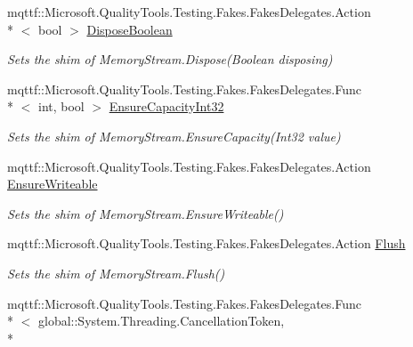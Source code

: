 \begin{DoxyCompactItemize}
mqttf\-::\-Microsoft.\-Quality\-Tools.\-Testing.\-Fakes.\-Fakes\-Delegates.\-Action\\*
$<$ bool $>$ \hyperlink{class_system_1_1_i_o_1_1_fakes_1_1_shim_memory_stream_ab2c9da88c1c5cb0ca93fac67727fd204}{Dispose\-Boolean}
\begin{DoxyCompactList}\small\item\em Sets the shim of Memory\-Stream.\-Dispose(\-Boolean disposing)\end{DoxyCompactList}\item 
mqttf\-::\-Microsoft.\-Quality\-Tools.\-Testing.\-Fakes.\-Fakes\-Delegates.\-Func\\*
$<$ int, bool $>$ \hyperlink{class_system_1_1_i_o_1_1_fakes_1_1_shim_memory_stream_a800d6de02e7597b40bd59c3f79948085}{Ensure\-Capacity\-Int32}
\begin{DoxyCompactList}\small\item\em Sets the shim of Memory\-Stream.\-Ensure\-Capacity(\-Int32 value)\end{DoxyCompactList}\item 
mqttf\-::\-Microsoft.\-Quality\-Tools.\-Testing.\-Fakes.\-Fakes\-Delegates.\-Action \hyperlink{class_system_1_1_i_o_1_1_fakes_1_1_shim_memory_stream_a77e0eb2277bb63ac47d66c72edcfdcbe}{Ensure\-Writeable}
\begin{DoxyCompactList}\small\item\em Sets the shim of Memory\-Stream.\-Ensure\-Writeable()\end{DoxyCompactList}\item 
mqttf\-::\-Microsoft.\-Quality\-Tools.\-Testing.\-Fakes.\-Fakes\-Delegates.\-Action \hyperlink{class_system_1_1_i_o_1_1_fakes_1_1_shim_memory_stream_a7d00bda223f8ed2d83e0f675e31b789f}{Flush}
\begin{DoxyCompactList}\small\item\em Sets the shim of Memory\-Stream.\-Flush()\end{DoxyCompactList}\item 
mqttf\-::\-Microsoft.\-Quality\-Tools.\-Testing.\-Fakes.\-Fakes\-Delegates.\-Func\\*
$<$ global\-::\-System.\-Threading.\-Cancellation\-Token, \\*

\end{DoxyCompactItemize}
